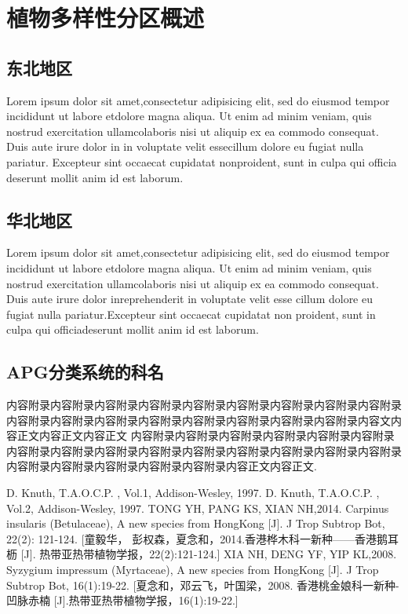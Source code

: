 \part{植物多样性分区概述}
\chapter{东北地区}
\begin{multicols}{2}
Lorem ipsum dolor sit amet,consectetur adipisicing elit, sed do eiusmod tempor incididunt ut labore etdolore magna aliqua. Ut enim ad minim veniam, quis nostrud exercitation ullamcolaboris nisi ut aliquip ex ea commodo consequat. Duis aute irure dolor in  in voluptate velit essecillum dolore eu fugiat nulla pariatur. Excepteur sint occaecat cupidatat nonproident, sunt in culpa qui officia deserunt mollit anim id est laborum.
\end{multicols}
\chapter{华北地区}
\begin{multicols}{2}
Lorem ipsum dolor sit amet,consectetur adipisicing elit, sed do eiusmod tempor incididunt ut labore etdolore magna aliqua. Ut enim ad minim veniam, quis nostrud exercitation ullamcolaboris nisi ut aliquip ex ea commodo consequat. Duis aute irure dolor inreprehenderit in voluptate velit esse cillum dolore eu fugiat nulla pariatur.Excepteur sint occaecat cupidatat non proident, sunt in culpa qui officiadeserunt mollit anim id est laborum.
\end{multicols}

\appendix
\chapter{APG分类系统的科名}
内容附录内容附录内容附录内容附录内容附录内容附录内容附录内容附录内容附录内容附录内容附录内容附录内容附录内容附录内容附录内容附录内容附录内容文内容正文内容正文内容正文
内容附录内容附录内容附录内容附录内容附录内容附录内容附录内容附录内容附录内容附录内容附录内容附录内容附录内容附录内容附录内容附录内容附录内容附录内容附录内容附录内容正文内容正文\cite{DK1}.
\renewcommand\indexname{索~~引}
\printindex
{}
\backmatter
{}
\begin{thebibliography}{参考文献}
 D. Knuth, T.A.O.C.P. , Vol.1, Addison-Wesley, 1997.
 D. Knuth, T.A.O.C.P. , Vol.2, Addison-Wesley, 1997.
 TONG YH, PANG KS, XIAN NH,2014. Carpinus insularis (Betulaceae), A new species from HongKong [J]. J Trop Subtrop Bot, 22(2): 121-124. [童毅华， 彭权森，夏念和，2014.香港桦木科一新种——香港鹅耳枥 [J]. 热带亚热带植物学报，22(2):121-124.]
 XIA NH, DENG YF, YIP KL,2008. Syzygium impressum (Myrtaceae), A new species from HongKong [J]. J Trop Subtrop Bot, 16(1):19-22. [夏念和，邓云飞，叶国梁，2008. 香港桃金娘科一新种-凹脉赤楠 [J].热带亚热带植物学报，16(1):19-22.]
\end{thebibliography}
